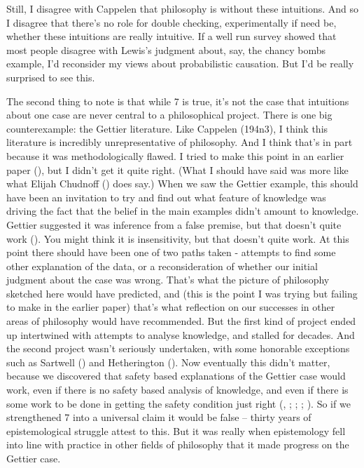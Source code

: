 \documentclass[
  11pt,
  letterpaper,
  DIV=11,
  numbers=noendperiod,
  twoside]{scrartcl}
\begin{document}
Still, I disagree with Cappelen that philosophy is without these
intuitions. And so I disagree that there's no role for double checking,
experimentally if need be, whether these intuitions are really
intuitive. If a well run survey showed that most people disagree with
Lewis's judgment about, say, the chancy bombs example, I'd reconsider my
views about probabilistic causation. But I'd be really surprised to see
this.

The second thing to note is that while 7 is true, it's not the case that
intuitions about one case are never central to a philosophical project.
There is one big counterexample: the Gettier literature. Like Cappelen
(194n3), I think this literature is incredibly unrepresentative of
philosophy. And I think that's in part because it was methodologically
flawed. I tried to make this point in an earlier paper
(), but I didn't
get it quite right. (What I should have said was more like what Elijah
Chudnoff () does say.) When we saw the
Gettier example, this should have been an invitation to try and find out
what feature of knowledge was driving the fact that the belief in the
main examples didn't amount to knowledge. Gettier suggested it was
inference from a false premise, but that doesn't quite work
(). You might think it is
insensitivity, but that doesn't quite work. At this point there should
have been one of two paths taken - attempts to find some other
explanation of the data, or a reconsideration of whether our initial
judgment about the case was wrong. That's what the picture of philosophy
sketched here would have predicted, and (this is the point I was trying
but failing to make in the earlier paper) that's what reflection on our
successes in other areas of philosophy would have recommended. But the
first kind of project ended up intertwined with attempts to analyse
knowledge, and stalled for decades. And the second project wasn't
seriously undertaken, with some honorable exceptions such as Sartwell
() and Hetherington
(). Now eventually this didn't
matter, because we discovered that safety based explanations of the
Gettier case would work, even if there is no safety based analysis of
knowledge, and even if there is some work to be done in getting the
safety condition just right
(,
;
;
;
). So if we
strengthened 7 into a universal claim it would be false -- thirty years
of epistemological struggle attest to this. But it was really when
epistemology fell into line with practice in other fields of philosophy
that it made progress on the Gettier case.
\end{document}

